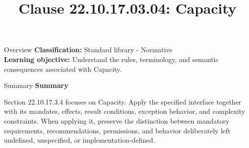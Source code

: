 \documentclass[10pt,letterpaper]{article}
\title{Clause 22.10.17.03.04: Capacity}
\author{}
\date{}
\begin{document}
\maketitle
\begin{CornellOverviewBox}{Overview}
\textbf{Classification:} Standard library - Normative\\[2pt]
\textbf{Learning objective:} Understand the rules, terminology, and semantic consequences associated with Capacity.
\end{CornellOverviewBox}\begin{CornellSummaryBox}{Summary}
{\sffamily\bfseries\color{Accent} Summary}\par\vspace{3pt}Section 22.10.17.3.4 focuses on Capacity. Apply the specified interface together with its mandates, effects, result conditions, exception behavior, and complexity constraints. When applying it, preserve the distinction between mandatory requirements, recommendations, permissions, and behavior deliberately left undefined, unspecified, or implementation-defined.
\end{CornellSummaryBox}
\end{document}

